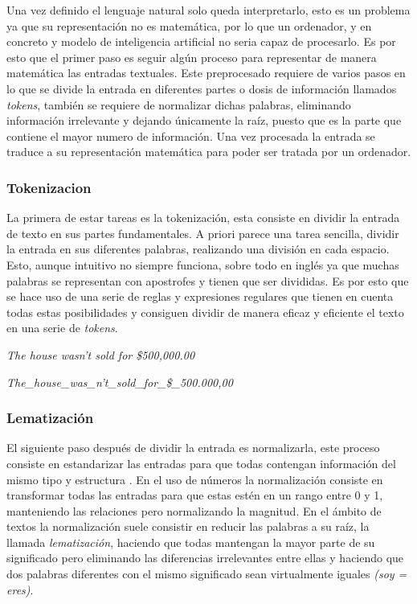 Una vez definido el lenguaje natural solo queda interpretarlo, esto es un
problema ya que su representación no es matemática, por lo que un ordenador, y
en concreto y modelo de inteligencia artificial no seria capaz de procesarlo. Es
por esto que el primer paso es seguir algún proceso para representar de manera
matemática las entradas textuales. Este preprocesado requiere de varios pasos
en lo que se divide la entrada en diferentes partes o dosis de información
llamados \textit{tokens}, también se requiere de normalizar dichas
palabras, eliminando información irrelevante y dejando únicamente la raíz,
puesto que es la parte que contiene el mayor numero de información. Una vez
procesada la entrada se traduce a su representación matemática para poder ser
tratada por un ordenador. 

\subsubsection{Tokenizacion}
La primera de estar tareas es la tokenización, esta consiste en dividir la
entrada de texto en sus partes fundamentales. A priori parece una tarea
sencilla, dividir la entrada en sus diferentes palabras, realizando una división
en cada espacio. Esto, aunque intuitivo no siempre funciona, sobre todo en
inglés ya que muchas palabras se representan con apostrofes y tienen que ser
divididas. Es por esto que se hace uso de una serie de reglas y expresiones
regulares que tienen en cuenta todas
estas posibilidades y consiguen dividir de manera eficaz y eficiente el texto en
una serie de \textit{tokens}.

\begin{center}
	\textit{The house wasn't sold for \$500,000.00}

	\textit{The\_house\_was\_n't\_sold\_for\_\$\_500.000,00}
\end{center}

\subsubsection{Lematización}

El siguiente paso después de dividir la entrada es normalizarla, este proceso
consiste en estandarizar las entradas para que todas contengan información del
mismo tipo y estructura \cite{MicrosoftNormalizeData}. En el uso de números la
normalización consiste en transformar todas las entradas para que estas estén en un
rango entre 0 y 1, manteniendo las relaciones pero normalizando la magnitud. En
el ámbito de textos la normalización suele consistir en reducir las palabras a
su raíz, la llamada \textit{lematización}, haciendo que todas mantengan la
mayor parte de su significado pero eliminando las diferencias irrelevantes
entre ellas y haciendo que dos palabras diferentes con el mismo significado sean
virtualmente iguales \textit{(soy = eres)}. \cite{TextNormalizationNLP}

